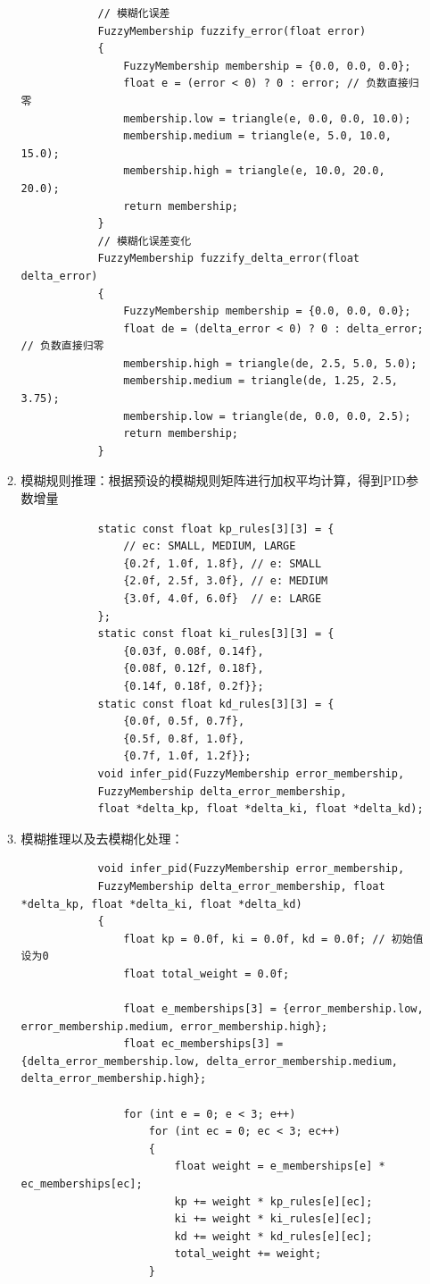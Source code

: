 \documentclass[UTF8]{ctexart}
\begin{document}
\begin{enumerate}
\begin{enumerate}
\begin{lstlisting}
			// 模糊化误差
			FuzzyMembership fuzzify_error(float error)
			{
				FuzzyMembership membership = {0.0, 0.0, 0.0};
				float e = (error < 0) ? 0 : error; // 负数直接归零
				membership.low = triangle(e, 0.0, 0.0, 10.0);
				membership.medium = triangle(e, 5.0, 10.0, 15.0);
				membership.high = triangle(e, 10.0, 20.0, 20.0);
				return membership;
			}
			// 模糊化误差变化
			FuzzyMembership fuzzify_delta_error(float delta_error)
			{
				FuzzyMembership membership = {0.0, 0.0, 0.0};
				float de = (delta_error < 0) ? 0 : delta_error; // 负数直接归零
				membership.high = triangle(de, 2.5, 5.0, 5.0);
				membership.medium = triangle(de, 1.25, 2.5, 3.75);
				membership.low = triangle(de, 0.0, 0.0, 2.5);
				return membership;
			}
		\end{lstlisting}
		\item 模糊规则推理：根据预设的模糊规则矩阵进行加权平均计算，得到PID参数增量
		\begin{lstlisting}
			static const float kp_rules[3][3] = {
				// ec: SMALL, MEDIUM, LARGE
				{0.2f, 1.0f, 1.8f}, // e: SMALL
				{2.0f, 2.5f, 3.0f}, // e: MEDIUM
				{3.0f, 4.0f, 6.0f}  // e: LARGE
			};
			static const float ki_rules[3][3] = {
				{0.03f, 0.08f, 0.14f},
				{0.08f, 0.12f, 0.18f},
				{0.14f, 0.18f, 0.2f}};
			static const float kd_rules[3][3] = {
				{0.0f, 0.5f, 0.7f},
				{0.5f, 0.8f, 1.0f},
				{0.7f, 1.0f, 1.2f}};
			void infer_pid(FuzzyMembership error_membership, 
			FuzzyMembership delta_error_membership, 
			float *delta_kp, float *delta_ki, float *delta_kd);
		\end{lstlisting}
		\item 模糊推理以及去模糊化处理：
		\begin{lstlisting}
			void infer_pid(FuzzyMembership error_membership, 
			FuzzyMembership delta_error_membership, float *delta_kp, float *delta_ki, float *delta_kd)
			{
				float kp = 0.0f, ki = 0.0f, kd = 0.0f; // 初始值设为0
				float total_weight = 0.0f;
				
				float e_memberships[3] = {error_membership.low, error_membership.medium, error_membership.high};
				float ec_memberships[3] = {delta_error_membership.low, delta_error_membership.medium, delta_error_membership.high};
				
				for (int e = 0; e < 3; e++)
					for (int ec = 0; ec < 3; ec++)
					{
						float weight = e_memberships[e] * ec_memberships[ec];
						kp += weight * kp_rules[e][ec];
						ki += weight * ki_rules[e][ec];
						kd += weight * kd_rules[e][ec];
						total_weight += weight;
					}
				

\end{lstlisting}
\end{enumerate}
\end{enumerate}
\end{document}
